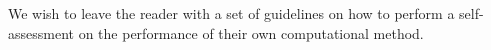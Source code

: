 We wish to leave the reader with a set of guidelines on how to perform a self-assessment on the performance of their own computational method.




